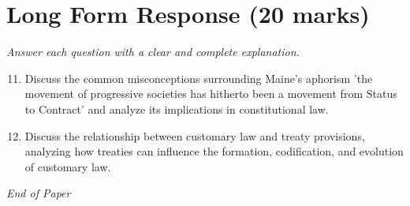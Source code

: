 \documentclass[12pt]{article}
\begin{document}
\section*{Long Form Response (20 marks)}
\textit{Answer each question with a clear and complete explanation.}
\begin{enumerate}[label=\arabic*.]
\setcounter{enumi}{10}
\item Discuss the common misconceptions surrounding Maine's aphorism 'the movement of progressive societies has hitherto been a movement from Status to Contract' and analyze its implications in constitutional law.
\item Discuss the relationship between customary law and treaty provisions, analyzing how treaties can influence the formation, codification, and evolution of customary law.
\end{enumerate}

\vfill
\noindent\textit{End of Paper}
\end{document}
